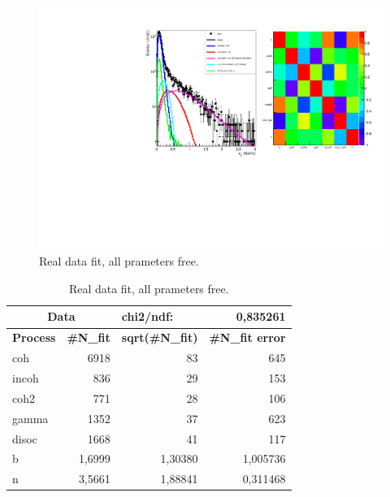 \documentclass{beamer}
\begin{document}
\begin{frame}

\begin{figure}[!ht]
\centering
 {\includegraphics[width=\textwidth]{dataPt_fit.pdf}
\caption{Real data fit, all prameters free.} 
\label{fig:}}
\end{figure}

\end{frame}
\begin{frame}

\begin{table}[!hb]
\begin{center}
\begin{tabular}{|l|r|r|r|}
\hline
\multicolumn{ 2}{|c|}{\textbf{Data}} & \multicolumn{1}{l|}{chi2/ndf:} & 0,835261 \\ \hline
\textbf{Process} & \multicolumn{1}{l|}{\textbf{\#N\_fit}} & \multicolumn{1}{l|}{\textbf{sqrt(\#N\_fit)}} & \multicolumn{1}{l|}{\textbf{\#N\_fit error}} \\ \hline
coh & 6918 & 83 & 645 \\ \hline
incoh & 836 & 29 & 153 \\ \hline
coh2 & 771 & 28 & 106 \\ \hline
gamma & 1352 & 37 & 623 \\ \hline
disoc & 1668 & 41 & 117 \\ \hline
b & 1,6999 & 1,30380 & 1,005736 \\ \hline
n & 3,5661 & 1,88841 & 0,311468 \\ \hline
\end{tabular}
\end{center}
\caption{Real data fit, all prameters free.}
\label{}
\end{table}

\end{frame}
\end{document}
